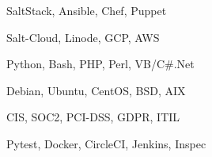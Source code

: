 \item[\textbf{Automation}] SaltStack, Ansible, Chef, Puppet
\item[\textbf{Cloud}] Salt-Cloud, Linode, GCP, AWS
\item[\textbf{Languages}] Python, Bash, PHP, Perl, VB/C\#.Net
\item[\textbf{OS}] Debian, Ubuntu, CentOS, BSD, AIX
\item[\textbf{Policies}] CIS, SOC2, PCI-DSS, GDPR, ITIL
\item[\textbf{Testing}] Pytest, Docker, CircleCI, Jenkins, Inspec